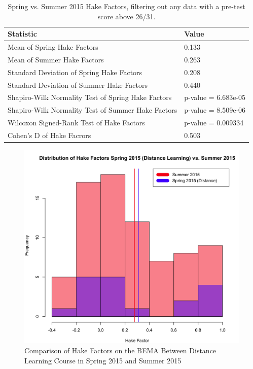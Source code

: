 \pagebreak\clearpage

\begin{small}
\begin{table}
  \centering
  \begin{tabular}{|l|l|}
    \hline
    \textbf{Statistic} & \textbf{Value} \\
	\hline
	Mean of Spring Hake Factors & 0.133 \\
	\hline
	Mean of Summer Hake Factors & 0.263 \\
	\hline
	Standard Deviation of Spring Hake Factors & 0.208 \\
	\hline
	Standard Deviation of Summer Hake Factors & 0.440 \\
	\hline
	Shapiro-Wilk Normality Test of Spring Hake Factors & p-value = 6.683e-05 \\
	\hline
	Shapiro-Wilk Normality Test of Summer Hake Factors & p-value = 8.509e-06 \\
	\hline
	Wilcoxon Signed-Rank Test of Hake Factors & p-value = 0.009334 \\
	\hline
	Cohen's D of Hake Facrors & 0.503 \\
	\hline
  \end{tabular}
  \caption{Spring vs. Summer 2015 Hake Factors, filtering out any data with a pre-test score above 26/31.}
  \label{tab:hakeFiltered}
\end{table}
\end{small}

\pagebreak\clearpage

\begin{figure}
	\centering
	\includegraphics[width=5in]{img/chapter4/hake_su15_vs_sp15d}
	\caption{Comparison of Hake Factors on the BEMA Between Distance Learning Course in Spring 2015 and Summer 2015}
  \label{fig:hakeSp15dSu15}
\end{figure}


